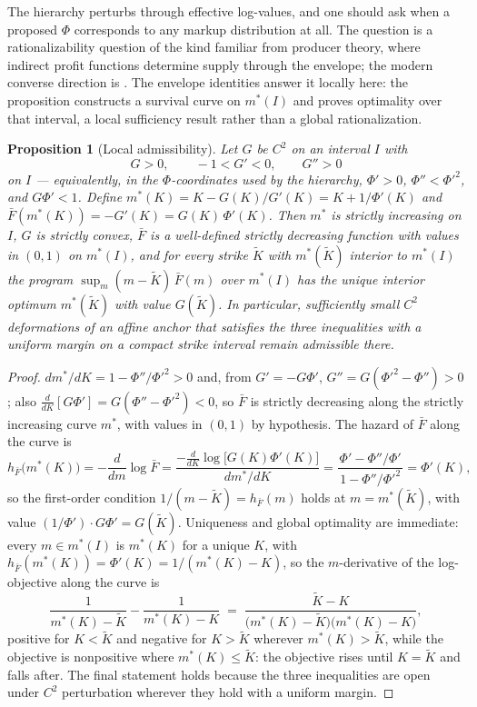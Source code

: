 \documentclass[11pt]{article}
\newtheorem{proposition}{Proposition}
\newcommand{\Fbar}{\bar F}
\begin{document}
The hierarchy perturbs through effective log-values, and one should ask when a proposed $\Phi$ corresponds to any markup distribution at all. The question is a rationalizability question of the kind familiar from producer theory, where indirect profit functions determine supply through the envelope; the modern converse direction is \citet{sinander2022}. The envelope identities answer it locally here: the proposition constructs a survival curve on $m^\ast(I)$ and proves optimality over that interval, a local sufficiency result rather than a global rationalization.

\begin{proposition}[Local admissibility]\label{prop:admissible}
Let $G$ be $C^2$ on an interval $I$ with
\[
G > 0, \qquad -1 < G' < 0, \qquad G'' > 0
\]
on $I$ --- equivalently, in the $\Phi$-coordinates used by the hierarchy, $\Phi' > 0$, $\Phi'' < \Phi'^2$, and $G\Phi' < 1$. Define $m^\ast(K) = K - G(K)/G'(K) = K + 1/\Phi'(K)$ and $\Fbar(m^\ast(K)) = -G'(K) = G(K)\,\Phi'(K)$. Then $m^\ast$ is strictly increasing on $I$, $G$ is strictly convex, $\Fbar$ is a well-defined strictly decreasing function with values in $(0,1)$ on $m^\ast(I)$, and for every strike $\widetilde K$ with $m^\ast(\widetilde K)$ interior to $m^\ast(I)$ the program $\sup_m (m - \widetilde K)\,\Fbar(m)$ over $m^\ast(I)$ has the unique interior optimum $m^\ast(\widetilde K)$ with value $G(\widetilde K)$. In particular, sufficiently small $C^2$ deformations of an affine anchor that satisfies the three inequalities with a uniform margin on a compact strike interval remain admissible there.
\end{proposition}

\begin{proof}
$dm^\ast/dK = 1 - \Phi''/\Phi'^2 > 0$ and, from $G' = -G\Phi'$, $G'' = G(\Phi'^2 - \Phi'') > 0$; also $\tfrac{d}{dK}[G\Phi'] = G(\Phi'' - \Phi'^2) < 0$, so $\Fbar$ is strictly decreasing along the strictly increasing curve $m^\ast$, with values in $(0,1)$ by hypothesis. The hazard of $\Fbar$ along the curve is
\[
h_{\Fbar}\big(m^\ast(K)\big) = -\frac{d}{dm}\log\Fbar
= \frac{-\tfrac{d}{dK}\log\big[G(K)\Phi'(K)\big]}{dm^\ast/dK}
= \frac{\Phi' - \Phi''/\Phi'}{\,1 - \Phi''/\Phi'^2\,} = \Phi'(K),
\]
so the first-order condition $1/(m - \widetilde K) = h_{\Fbar}(m)$ holds at $m = m^\ast(\widetilde K)$, with value $(1/\Phi')\cdot G\Phi' = G(\widetilde K)$. Uniqueness and global optimality are immediate: every $m \in m^\ast(I)$ is $m^\ast(K)$ for a unique $K$, with $h_{\Fbar}(m^\ast(K)) = \Phi'(K) = 1/(m^\ast(K) - K)$, so the $m$-derivative of the log-objective along the curve is
\[
\frac{1}{m^\ast(K) - \widetilde K} - \frac{1}{m^\ast(K) - K}
\;=\; \frac{\widetilde K - K}{\big(m^\ast(K) - \widetilde K\big)\big(m^\ast(K) - K\big)} ,
\]
positive for $K < \widetilde K$ and negative for $K > \widetilde K$ wherever $m^\ast(K) > \widetilde K$, while the objective is nonpositive where $m^\ast(K) \le \widetilde K$: the objective rises until $K = \widetilde K$ and falls after. The final statement holds because the three inequalities are open under $C^2$ perturbation wherever they hold with a uniform margin.
\end{proof}
\end{document}
